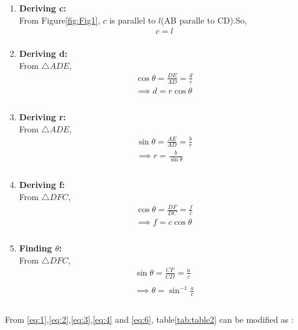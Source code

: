 \documentclass{article}
\begin{document}
\begin{enumerate}
	\item \textbf{Deriving c:}\\
		From Figure\ref{fig:Fig1}, $c$ is  parallel to $l$(AB paralle to CD).So,
		\begin{align}
			c = l\\
			\label{eq:1}
		\end{align}
	\item \textbf{Deriving d:}\\
		From $\triangle{ADE}$,\\
		\begin{align}
			\cos{\theta} = \frac{DE}{AD} = \frac{d}{r}\\
			\implies d = r\cos{\theta}\\
			\label{eq:2}\\
		\end{align}
	\item \textbf{Deriving r:}\\
		From $\triangle{ADE}$,\\
		\begin{align}
			\sin{\theta} = \frac{AE}{AD} = \frac{b}{r}\\
			\implies r = \frac{b}{\sin{\theta}}\\
			\label{eq:3}\\
		\end{align}
	\item \textbf{Deriving f:}\\
		From $\triangle{DFC}$,\\
		\begin{align}
			\cos{\theta} = \frac{DF}{DC} = \frac{f}{c}\\
			\implies f = c\cos{\theta}\\
			\label{eq:4}\\
		\end{align}
	\item \textbf{Finding $\theta$:}\\
		From $\triangle{DFC}$,\\
		\begin{align}
			\sin{\theta} = \frac{CF}{CD} = \frac{a}{c}\\
			\label{eq:5}\\
			\implies \theta = \sin^{-1}\frac{a}{c}\\
			\label{eq:6}\\
		\end{align}
\end{enumerate}
From \ref{eq:1},\ref{eq:2},\ref{eq:3},\ref{eq:4} and \ref{eq:6}, table\ref{tab:table2} can be modified as :\\
\end{document}
